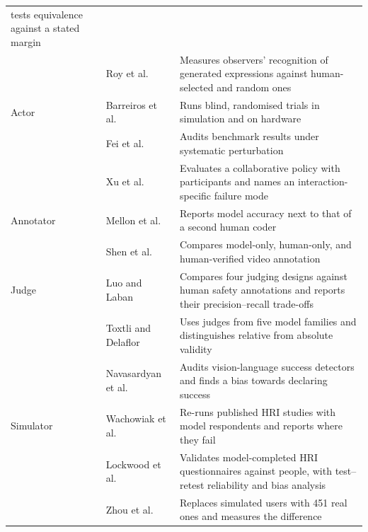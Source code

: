 \begin{table}[!t]
\begin{tabularx}{\textwidth}{@{}L{1.9cm}L{3.3cm}Y@{}}
tests equivalence against a stated margin \\
 & Roy et al.\ \cite{roy2025gpt} & Measures observers' recognition of
generated expressions against human-selected and random ones \\
 Actor & Barreiros et al.\ \cite{barreiros2026careful} & Runs blind,
randomised trials in simulation and on hardware \\
 & Fei et al.\ \cite{fei2025liberoplus} & Audits benchmark results under
systematic perturbation \\
 & Xu et al.\ \cite{xu2026learning} & Evaluates a collaborative policy with
participants and names an interaction-specific failure mode \\
 Annotator & Mellon et al.\ \cite{mellon2024do} & Reports model
accuracy next to that of a second human coder \\
 & Shen et al.\ \cite{shen2026can} & Compares model-only, human-only, and
human-verified video annotation \\
 Judge & Luo and Laban \cite{luo2025dialogguard} & Compares four
judging designs against human safety annotations and reports their
precision--recall trade-offs \\
 & Toxtli and Delaflor \cite{toxtli2026llm} & Uses judges from five model
families and distinguishes relative from absolute validity \\
 & Navasardyan et al.\ \cite{navasardyan2026failbench} & Audits
vision-language success detectors and finds a bias towards declaring
success \\
 Simulator & Wachowiak et al.\ \cite{wachowiak2024large} & Re-runs
published HRI studies with model respondents and reports where they fail \\
 & Lockwood et al.\ \cite{lockwood2026when} & Validates model-completed HRI
questionnaires against people, with test--retest reliability and bias
analysis \\
 & Zhou et al.\ \cite{zhou2026mind} & Replaces simulated users with 451
real ones and measures the difference \\
\bottomrule
\end{tabularx}
\end{table}
